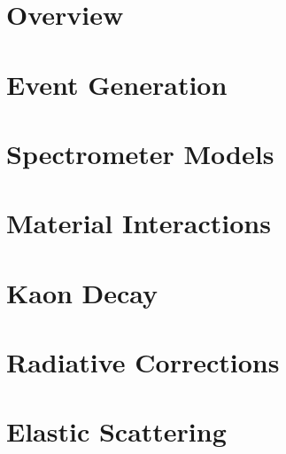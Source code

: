 \label{Chapter-7}

\hypertarget{Section-7.1}{%
\section{Overview}\label{Section-7.1}}

\hypertarget{Section-7.2}{%
\section{Event Generation}\label{Section-7.2}}

\hypertarget{Section-7.3}{%
\section{Spectrometer Models}\label{Section-7.3}}

\hypertarget{Section-7.4}{%
\section{Material Interactions}\label{Section-7.4}}

\hypertarget{Section-7.5}{%
\section{Kaon Decay}\label{Section-7.5}}

\hypertarget{Section-7.6}{%
\section{Radiative Corrections}\label{Section-7.6}}

\hypertarget{Section-7.7}{%
\section{Elastic Scattering}\label{Section-7.7}}


